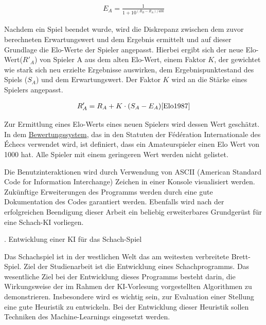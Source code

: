 \begin{equation}
\begin{aligned}
E_{A} = \frac{1}{1 + 10^{({R_{B} - R_{A}})/400}}
\end{aligned}
\end{equation}

Nachdem ein Spiel beendet wurde, wird die Diskrepanz zwischen dem zuvor berechneten Erwartungswert und dem Ergebnis ermittelt und auf dieser Grundlage die Elo-Werte der Spieler angepasst. Hierbei ergibt sich der neue Elo-Wert($R'_{A}$) von Spieler A aus dem alten Elo-Wert, einem Faktor $K$, der gewichtet wie stark sich neu erzielte Ergebnisse auswirken, dem Ergebnispunktestand des Spiels ($S_{A}$) und dem Erwartungswert. Der Faktor $K$ wird an die Stärke eines Spielers angepasst.

\begin{equation}
\begin{aligned}
R'_{A} = R_{A} + K \cdot (S_{A} - E_{A})
\cite{Elo1987}
\end{aligned}
\end{equation}

Zur Ermittlung eines Elo-Werts eines neuen Spielers wird dessen Wert geschätzt. In dem \href{https://www.fide.com/fide/handbook.html?id=197&view=article}{Bewertungssystem}, das in den Statuten der Fédération Internationale des Échecs verwendet wird, ist definiert, dass ein Amateurspieler einen Elo Wert von 1000 hat. Alle Spieler mit einem geringeren Wert werden nicht gelistet.\cite{FIDE2017}

Die Benutzinteraktionen wird durch Verwendung von \acs{ASCII} (American Standard Code for Information Interchange) Zeichen in einer Konsole visualisiert werden. Zukünftige Erweiterungen des Programms werden durch eine gute Dokumentation des Codes garantiert werden. Ebenfalls wird nach der erfolgreichen Beendigung dieser Arbeit ein beliebig erweiterbares Grundgerüst für eine Schach-KI vorliegen.


. Entwicklung einer KI für das Schach-Spiel

   Das Schachspiel ist in der westlichen Welt das am weitesten verbreitete Brett-Spiel.  Ziel der Studienarbeit
   ist die Entwicklung eines Schachprogramms.  Das wesentliche Ziel bei der Entwicklung dieses Programms
   besteht darin, die Wirkungsweise der im Rahmen der KI-Vorlesung vorgestellten Algorithmen zu demonstrieren.
   Insbesondere wird es wichtig sein, zur Evaluation einer Stellung eine gute Heuristik
   zu entwickeln.  Bei der Entwicklung dieser Heuristik sollen Techniken des Machine-Learnings eingesetzt
   werden.

